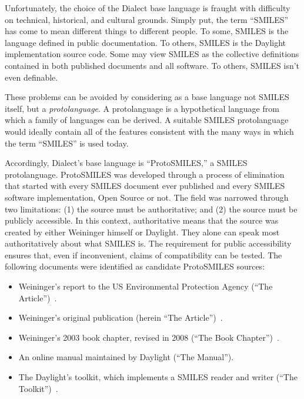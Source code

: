 \documentclass{article}
\begin{document}
Unfortunately, the choice of the Dialect base language is fraught with difficulty on technical, historical, and cultural grounds. Simply put, the term \enquote{SMILES} has come to mean different things to different people. To some, SMILES is the language defined in public documentation. To others, SMILES is the Daylight implementation source code. Some may view SMILES as the collective definitions contained in both published documents and all software. To others, SMILES isn't even definable.

These problems can be avoided by considering as a base language not SMILES itself, but a \textit{protolanguage}. A protolanguage is a hypothetical language from which a family of languages can be derived. A suitable SMILES protolanguage would ideally contain all of the features consistent with the many ways in which the term \enquote{SMILES} is used today.

Accordingly, Dialect's base language is \enquote{ProtoSMILES,} a SMILES protolanguage. ProtoSMILES was developed through a process of elimination that started with every SMILES document ever published and every SMILES software implementation, Open Source or not. The field was narrowed through two limitations: (1) the source must be authoritative; and (2) the source must be publicly accessible. In this context, authoritative means that the source was created by either Weininger himself or Daylight. They alone can speak most authoritatively about what SMILES is. The requirement for public accessibility ensures that, even if inconvenient, claims of compatibility can be tested. The following documents were identified as candidate ProtoSMILES sources:

\begin{itemize}
    \item Weininger's report to the US Environmental Protection Agency (\enquote{The Article})~\cite{anderson:1987}.
    \item Weininger's original publication (herein \enquote{The Article})~\cite{weininger:1988}.
    \item Weininger's 2003 book chapter, revised in 2008 (\enquote{The Book Chapter})~\cite{weininger:2003}.
    \item An online manual maintained by Daylight (\enquote{The Manual}).
    \item The Daylight's toolkit, which implements a SMILES reader and writer (\enquote{The Toolkit})~\cite{daylightToolkit}.
\end{itemize}
\end{document}
